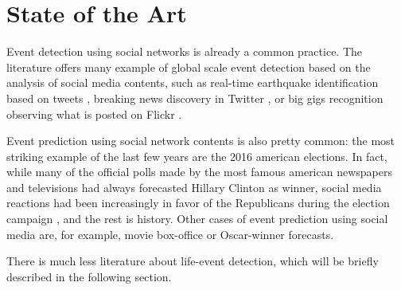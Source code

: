 \chapter{State of the Art}
\label{cha:intro}

Event detection using social networks is already a common practice. The literature offers many example of global scale event detection based on the analysis of social media contents, such as real-time earthquake identification based on tweets \cite{sakaki2010earthquake}, breaking news discovery in Twitter \cite{jackoway2011identification, phuvipadawat2010breaking}, or big gigs recognition observing what is posted on Flickr \cite{liu2011using}.

Event prediction using social network contents is also pretty common: the most striking example of the last few years are the 2016 american elections. In fact, while many of the official polls made by the most famous american newspapers and televisions had always forecasted Hillary Clinton as winner, social media reactions had been increasingly in favor of the Republicans during the election campaign \cite{elections}, and the rest is history. Other cases of event prediction using social media are, for example, movie box-office \cite{asur2010predicting} or Oscar-winner forecasts.

There is much less literature about life-event detection, which will be briefly described in the following section.

